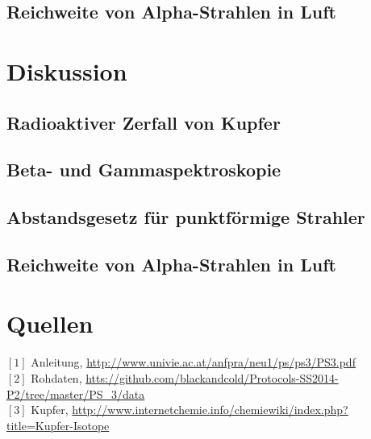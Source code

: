 \documentclass[12pt,a4paper]{article}
\begin{document}
\begin{multicols}{2}
\subsection{Reichweite von Alpha-Strahlen in Luft}



\pagebreak
\section{Diskussion}

\subsection{Radioaktiver Zerfall von Kupfer}

\subsection{Beta- und Gammaspektroskopie}

\subsection{Abstandsgesetz für punktförmige Strahler}

\subsection{Reichweite von Alpha-Strahlen in Luft}



\section{Quellen}
$[1]$ Anleitung, \url{http://www.univie.ac.at/anfpra/neu1/ps/ps3/PS3.pdf}\\
$[2]$ Rohdaten, \url{htts://github.com/blackandcold/Protocols-SS2014-P2/tree/master/PS_3/data}\\
$[3]$ Kupfer, \url{http://www.internetchemie.info/chemiewiki/index.php?title=Kupfer-Isotope}
\end{multicols}
\end{document}
